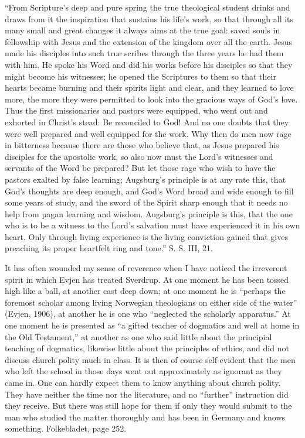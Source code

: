 “From Scripture’s deep and pure spring the true theological student drinks and draws from it the inspiration that sustains his life’s work, so that through all its many small and great changes it always aims at the true goal: saved souls in fellowship with Jesus and the extension of the kingdom over all the earth. Jesus made his disciples into such true scribes through the three years he had them with him. He spoke his Word and did his works before his disciples so that they might become his witnesses; he opened the Scriptures to them so that their hearts became burning and their spirits light and clear, and they learned to love more, the more they were permitted to look into the gracious ways of God’s love. Thus the first missionaries and pastors were equipped, who went out and exhorted in Christ’s stead: Be reconciled to God! And no one doubts that they were well prepared and well equipped for the work. Why then do men now rage in bitterness because there are those who believe that, as Jesus prepared his disciples for the apostolic work, so also now must the Lord’s witnesses and servants of the Word be prepared? But let those rage who wish to have the pastors exalted by false learning; Augsburg’s principle is at any rate this, that God’s thoughts are deep enough, and God’s Word broad and wide enough to fill some years of study, and the sword of the Spirit sharp enough that it needs no help from pagan learning and wisdom. Augsburg’s principle is this, that the one who is to be a witness to the Lord’s salvation must have experienced it in his own heart. Only through living experience is the living conviction gained that gives preaching its proper heartfelt ring and tone.” S. S. III, 21.

It has often wounded my sense of reverence when I have noticed the irreverent spirit in which Evjen has treated Sverdrup. At one moment he has been tossed high like a ball, at another cast deep down; at one moment he is “perhaps the foremost scholar among living Norwegian theologians on either side of the water” (Evjen, 1906), at another he is one who “neglected the scholarly apparatus.” At one moment he is presented as “a gifted teacher of dogmatics and well at home in the Old Testament,” at another as one who said little about the principial teaching of dogmatics, likewise little about the principles of ethics, and did not discuss church polity much in class. It is then of course self-evident that the men who left the school in those days went out approximately as ignorant as they came in. One can hardly expect them to know anything about church polity. They have neither the time nor the literature, and no “further” instruction did they receive. But there was still hope for them if only they would submit to the man who studied the matter thoroughly and has been in Germany and knows something. Folkebladet, page 252.

